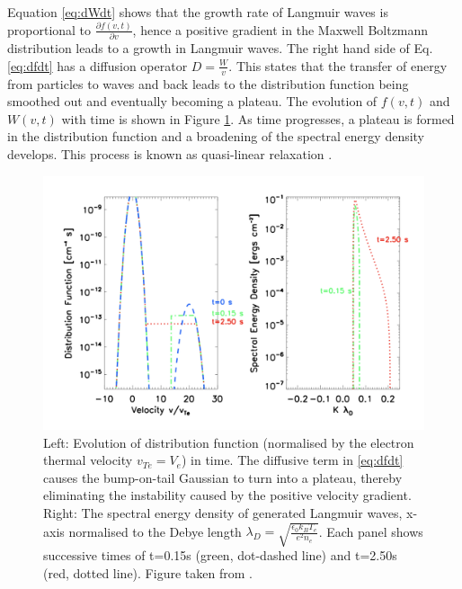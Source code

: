 Equation \ref{eq:dWdt} shows that the growth rate of Langmuir waves is proportional to $\frac{\partial f(v,t)}{\partial v}$, hence a positive gradient in the Maxwell Boltzmann distribution leads to a growth in Langmuir waves. The right hand side of Eq. \ref{eq:dfdt} has a diffusion operator $D=\frac{W}{v}$. This states that the transfer of energy from particles to waves and back leads to the distribution function being smoothed out and eventually becoming a plateau. The evolution of $f(v,t)$ and $W(v,t)$ with time is shown in Figure \ref{fig:Lwavegrowth}.  As time progresses, a plateau is formed in the distribution function and a broadening of the spectral energy density develops.	 This process is known as quasi-linear relaxation \citep{Melrose1987}.
\begin{figure}[ht]
    \centering
    \includegraphics[width=\columnwidth]{Images/L_wave_growth.png}
    \caption[Langmuir wave distriburtion function and spectral energy density.]{Left: Evolution of distribution function (normalised by the electron thermal velocity $v_{Te}=V_e$) in time. The diffusive term in \ref{eq:dfdt} causes the bump-on-tail Gaussian to turn into a plateau, thereby eliminating the instability caused by the positive velocity gradient. Right: The spectral energy density of generated Langmuir waves, x-axis normalised to the Debye length $\lambda_D=\sqrt{\frac{\epsilon_0 k_B T_e}{e^2 n_e}}$. Each panel shows successive times of t=0.15s (green, dot-dashed line) and t=2.50s (red, dotted line). Figure taken from \cite{Reid2014}.} %
    \label{fig:Lwavegrowth}
\end{figure}

